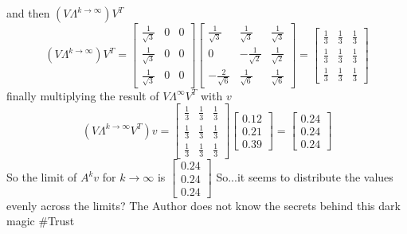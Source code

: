 \documentclass[12pt]{article}
\begin{document}
and then $(V \Lambda^{k \to \infty})V^T$
\begin{equation*}
    (V \Lambda^{k \to \infty})V^T = 
    \begin{bmatrix}
        \frac{1}{\sqrt{3}} & 0 & 0 \\
        \frac{1}{\sqrt{3}} & 0 & 0 \\
        \frac{1}{\sqrt{3}} & 0 & 0
    \end{bmatrix} 
    \begin{bmatrix}
        \frac{1}{\sqrt{3}} & \frac{1}{\sqrt{3}} & \frac{1}{\sqrt{3}} \\
        0 & -\frac{1}{\sqrt{2}} & \frac{1}{\sqrt{2}} \\
        -\frac{2}{\sqrt{6}} & \frac{1}{\sqrt{6}} & \frac{1}{\sqrt{6}}
    \end{bmatrix} = 
    \begin{bmatrix}
        \frac{1}{3} & \frac{1}{3} & \frac{1}{3} \\
        \frac{1}{3} & \frac{1}{3} & \frac{1}{3} \\
        \frac{1}{3} & \frac{1}{3} & \frac{1}{3}
    \end{bmatrix}
\end{equation*}
finally multiplying the result of $V\Lambda^\infty V^T$ with $v$
\begin{equation*}
    (V \Lambda^{k \to \infty} V^T)v = 
    \begin{bmatrix}
        \frac{1}{3} & \frac{1}{3} & \frac{1}{3} \\
        \frac{1}{3} & \frac{1}{3} & \frac{1}{3} \\
        \frac{1}{3} & \frac{1}{3} & \frac{1}{3}
    \end{bmatrix}
    \begin{bmatrix}
        0.12 \\
        0.21 \\
        0.39
    \end{bmatrix} = 
    \begin{bmatrix}
        0.24 \\
        0.24 \\
        0.24
    \end{bmatrix}
\end{equation*}
So the limit of $A^k v$ for $k \to \infty$ is $\begin{bmatrix}
    0.24 \\
    0.24 \\
    0.24
\end{bmatrix}$
So...it seems to distribute the values evenly across the limits? The Author does not know the secrets behind this dark magic \#Trust
\end{document}

